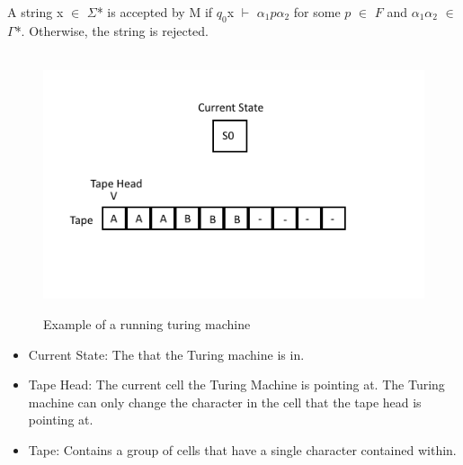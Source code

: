 \documentclass{report}
\begin{document}
A string x $\in$ $\Sigma$* is accepted by M if $q_0$x $\vdash$ $\alpha_1$$p$$\alpha_2$ for some $p$ $\in$ $F$ and $\alpha_1$$\alpha_2$ $\in$ $\Gamma$*. Otherwise, the string is rejected.
\pagebreak
    \begin{figure}[!ht]
  		\centering
   		 \
      	\includegraphics[scale=1]{TM_Example_Tape.png}
  \caption{Example of a running turing machine}
\end{figure}

\begin{itemize}
\item Current State: The that the Turing machine is in.
\item Tape Head: The current cell the Turing Machine is pointing at. The Turing machine can only change the character in the cell that the tape head is pointing at.
\item Tape: Contains a group of cells that have a single character contained within. 
\end{itemize}


\pagebreak
    
\iffalse Section 3: Overview ---------------------------- \fi
\end{document}
